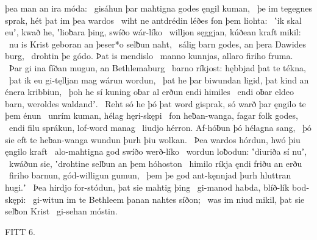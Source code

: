 þea man an ira móda: \hld\ gisáhun þar mahtigna
godes ęngil kuman, \hld\ þe im tegegnes sprak,
hét þat im þea wardos \hld\ wiht ne antdrédin
léðes fon þem liohta: \hld\ ʽik skal euʼ, kwað he, ʽlioƀara þing,
swíðo wár-líko \hld\ willjon sęggjan,
kúðean kraft mikil: \hld\ nu is Krist geboran
an þeser*o selƀun naht, \hld\ sálig barn godes,
an þera Dawides burg, \hld\ drohtin þe gódo.
Þat is mendislo \hld\ manno kunnjas,
allaro firiho fruma. \hld\ Þar gi ina fíðan mugun,
an Bethlemaburg \hld\ barno ríkjost:
hębbjad þat te tékna, \hld\ þat ik eu gi-tęlljan mag
wárun wordun, \hld\ þat he þar biwundan ligid,
þat kind an énera kribbiun, \hld\ þoh he sí kuning oƀar al
erðun endi himiles \hld\ endi oƀar eldeo barn,
weroldes waldandʼ. \hld\ Reht só he þó þat word gisprak,
só warð þar ęngilo te þem énun \hld\ unrím kuman,
hélag hęri-skępi \hld\ fon heƀan-wanga,
fagar folk godes, \hld\ endi filu sprákun,
lof-word manag \hld\ liudjo hérron.
Af-hóƀun þó hélagna sang, \hld\ þó sie eft te heƀan-wanga
wundun þurh þiu wolkan. \hld\ Þea wardos hórdun,
hwó þiu ęngilo kraft \hld\ alo-mahtigna god
swíðo werð-líko \hld\ wordun loƀodun:
ʽdiuriða sí nuʼ, \hld\ kwáðun sie, ʽdrohtine selƀun
an þem hóhoston \hld\ himilo ríkja
ęndi friðu an erðu \hld\ firiho barnun,
gód-willigun gumun, \hld\ þem þe god ant-kęnnjad
þurh hluttran hugi.ʼ \hld\ Þea hirdjo for-stódun,
þat sie mahtig þing \hld\ gi-manod habda,
blíð-lík bod-skępi: \hld\ gi-witun im te Bethleem þanan
nahtes síðon; \hld\ was im niud mikil,
þat sie selƀon Krist \hld\ gi-sehan móstin.

FITT 6.

